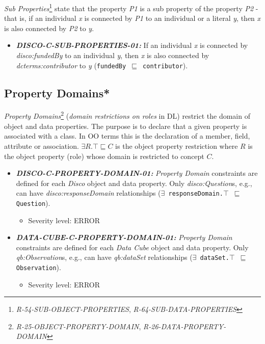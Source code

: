 \documentclass{llncs}
\newcommand{\ms}[1]{\texttt{#1}}
\begin{document}
{\em Sub Properties}\footnote{\emph{R-54-SUB-OBJECT-PROPERTIES}, \emph{R-64-SUB-DATA-PROPERTIES}} state that the property \emph{P1} is a sub property of the property \emph{P2} - that is, if an individual \emph{x} is connected by \emph{P1} to an individual or a literal \emph{y}, then \emph{x} is also connected by \emph{P2} to \emph{y}. 

\begin{itemize}
	\item \textbf{{\em DISCO-C-SUB-PROPERTIES-01:}}
If an individual \emph{x} is connected by {\em disco:fundedBy} to an individual \emph{y}, then \emph{x} is also connected by {\em dcterms:contributor} to \emph{y} (\ms{fundedBy $\sqsubseteq$ contributor}). 
\end{itemize}

\subsection{Property Domains*}

{\em Property Domains}\footnote{{\em R-25-OBJECT-PROPERTY-DOMAIN}, {\em R-26-DATA-PROPERTY-DOMAIN}} ({\em domain restrictions on roles} in DL) restrict the domain of object and data properties.
The purpose is to declare that a given property is associated with a class. 
In OO terms this is the declaration of a member, field, attribute or association. 
$\exists R. \top \sqsubseteq C$ is the object property restriction where $R$ is the object property (role) whose domain is restricted to concept $C$.

\begin{itemize}
	\item \textbf{{\em DISCO-C-PROPERTY-DOMAIN-01:}} 
	{\em Property Domain} constraints are defined for each \emph{Disco} object and data property.
  Only {\em disco:Question}s, e.g., can have {\em disco:responseDomain} relationships (\ms{$\exists$ responseDomain.$\top$ $\sqsubseteq$ Question}).
	\begin{itemize}
		\item Severity level: ERROR
	\end{itemize}
\end{itemize}

\begin{itemize}
	\item \textbf{{\em DATA-CUBE-C-PROPERTY-DOMAIN-01:}} 
	{\em Property Domain} constraints are defined for each \emph{Data Cube} object and data property.
  Only {\em qb:Observation}s, e.g., can have {\em qb:dataSet} relationships (\ms{$\exists$ dataSet.$\top$ $\sqsubseteq$ Observation}).
	\begin{itemize}
		\item Severity level: ERROR
	\end{itemize}
\end{itemize}
\end{document}

